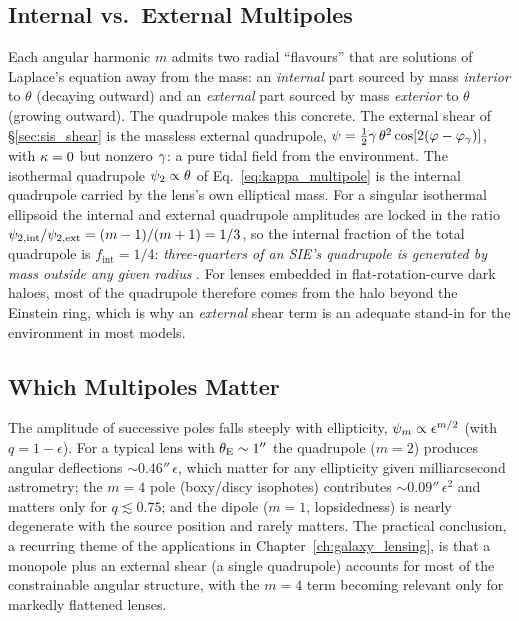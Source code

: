 \subsection{Internal vs.\ External Multipoles}
\label{sec:int_ext_multipoles}

Each angular harmonic $m$ admits two radial ``flavours'' that are
solutions of Laplace's equation away from the mass: an \emph{internal}
part sourced by mass \emph{interior} to $\theta$ (decaying outward) and
an \emph{external} part sourced by mass \emph{exterior} to $\theta$
(growing outward).  The quadrupole makes this concrete.  The external
shear of \S\ref{sec:sis_shear} is the massless external quadrupole,
$\psi = \tfrac12\gamma\,\theta^2
\cos[2(\varphi-\varphi_\gamma)]$, with $\kappa = 0$ but nonzero
$\gamma$: a pure tidal field from the environment.  The isothermal
quadrupole $\psi_2 \propto \theta$ of Eq.~\eqref{eq:kappa_multipole}
is the internal quadrupole carried by the lens's own elliptical mass.
For a singular isothermal ellipsoid the internal and external quadrupole
amplitudes are locked in the ratio
$\psi_{2,\mathrm{int}}/\psi_{2,\mathrm{ext}} = (m-1)/(m+1) = 1/3$, so
the internal fraction of the total quadrupole is
$f_{\mathrm{int}} = 1/4$: \emph{three-quarters of an SIE's quadrupole is
generated by mass outside any given radius}
\citep[][Part~2, eq.~74]{schneider_kochanek_wambsganss_2006}.  For lenses
embedded in flat-rotation-curve dark haloes, most of the quadrupole
therefore comes from the halo beyond the Einstein ring, which is
why an \emph{external} shear term is an adequate stand-in for
the environment in most models.

\subsection{Which Multipoles Matter}
\label{sec:which_multipoles}

The amplitude of successive poles falls steeply with ellipticity,
$\psi_m \propto \epsilon^{m/2}$ (with $q = 1-\epsilon$).  For a
typical lens with $\theta_{\mathrm{E}} \sim 1''$ the quadrupole ($m=2$) produces
angular deflections $\sim 0.46''\,\epsilon$, which matter for any
ellipticity given milliarcsecond astrometry; the $m=4$ pole
(boxy/discy isophotes) contributes $\sim 0.09''\,\epsilon^2$ and
matters only for $q \lesssim 0.75$; and the dipole ($m=1$,
lopsidedness) is nearly degenerate with the source position and
rarely matters.  The practical conclusion, a recurring theme of the
applications in Chapter~\ref{ch:galaxy_lensing}, is that a monopole
plus an external shear (a single quadrupole) accounts for most of the
constrainable angular structure, with the $m=4$ term becoming
relevant only for markedly flattened lenses.


